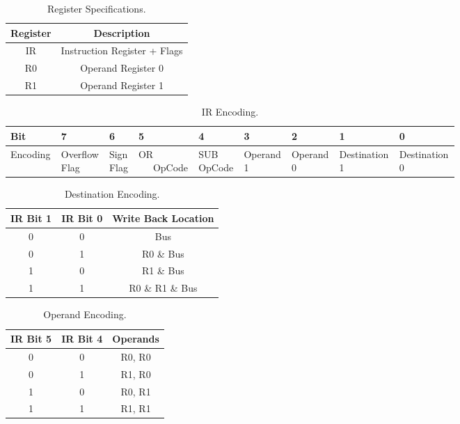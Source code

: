 \documentclass{article}
\begin{document}
\begin{table}[h!]
    \centering
    \begin{tabular}{|c||c|}
        \hline
        Register & Description \\
        \hline
        \hline
        IR & Instruction Register + Flags \\
        \hline
        R0 & Operand Register 0 \\
        \hline
        R1 & Operand Register 1 \\
        \hline
    \end{tabular}
    \caption{Register Specifications.}
    \label{tab:regs}
\end{table}

\begin{table}[h!]
    \centering
    \begin{tabular}{|p{0.09\linewidth}||p{0.075\linewidth}|p{0.06\linewidth}|p{0.0775\linewidth}|p{0.0775\linewidth}|p{0.085\linewidth}|p{0.085\linewidth}|p{0.1\linewidth}|p{0.1\linewidth}|}
        \hline
        Bit & 7 & 6 & 5 & 4 & 3 & 2 & 1 & 0 \\
        \hline
        \hline
        Encoding & Overflow Flag & Sign Flag & OR \ \ \ OpCode & SUB OpCode & Operand 1 & Operand 0 & Destination 1 & Destination 0 \\
        \hline
    \end{tabular}
    \caption{IR Encoding.}
    \label{tab:irenc}
\end{table}

\begin{table}[h!]
    \centering
    \begin{tabular}{|c|c||c|}
        \hline
        IR Bit 1 & IR Bit 0 & Write Back Location \\
        \hline
        \hline
        0 & 0 & Bus \\
        \hline
        0 & 1 & R0 \& Bus \\
        \hline
        1 & 0 & R1 \& Bus \\
        \hline
        1 & 1 & R0 \& R1 \& Bus \\
        \hline
    \end{tabular}
    \caption{Destination Encoding.}
    \label{tab:destenc}
\end{table}

\begin{table}[h!]
    \centering
    \begin{tabular}{|c|c||c|}
        \hline
        IR Bit 5 & IR Bit 4 & Operands \\
        \hline
        \hline
        0 & 0 & R0, R0 \\
        \hline
        0 & 1 & R1, R0 \\
        \hline
        1 & 0 & R0, R1 \\
        \hline
        1 & 1 & R1, R1 \\
        \hline
    \end{tabular}
    \caption{Operand Encoding.}
    \label{tab:openc}
\end{table}
\end{document}
